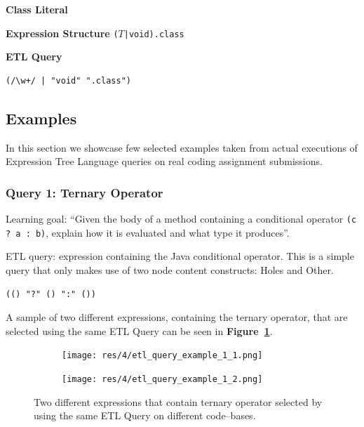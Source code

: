 \begin{chapterBody}
\noindent\textbf{Class Literal}
\vspace{1em}

\begin{minipage}[t]{.45\linewidth}
\textbf{Expression Structure} \hfill\break
\texttt{($T$|{\color{bp-blue}void}).{\color{bp-blue}class}}
\end{minipage}
\begin{minipage}[t]{.45\linewidth}
\textbf{ETL Query}
\begin{lstlisting}[language=etl]
(/\w+/ | "void" ".class")
\end{lstlisting}
\end{minipage}

\subsection{Examples}

In this section we showcase few selected examples taken from actual executions of
Expression Tree Language queries on real coding assignment submissions.

\subsubsection*{Query 1: Ternary Operator}

Learning goal: ``Given the body of a method containing a conditional operator
\texttt{(c ? a : b)}, explain how it is evaluated and what type it produces''.

ETL query: expression containing the Java conditional operator. This is
a simple query that only makes use of two node content constructs: Holes
and Other.

\begin{lstlisting}[language=etl]
(() "?" () ":" ())
\end{lstlisting}

A sample of two different expressions, containing the ternary operator, that
are selected using the same ETL Query can be seen in
\textbf{Figure~\ref{fig:etl-eval-query-sample-ternary}}.

\begin{figure}[ht]
    \centering
    \begin{subfigure}[b]{.45\textwidth}
        \texttt{[image: res/4/etl\_query\_example\_1\_1.png]}
    \end{subfigure}
    \begin{subfigure}[b]{.45\textwidth}
        \texttt{[image: res/4/etl\_query\_example\_1\_2.png]}
    \end{subfigure}
    \caption{Two different expressions that contain ternary operator selected
by using the same ETL Query on different code–bases.}
    \label{fig:etl-eval-query-sample-ternary}
\end{figure}


\end{chapterBody}
